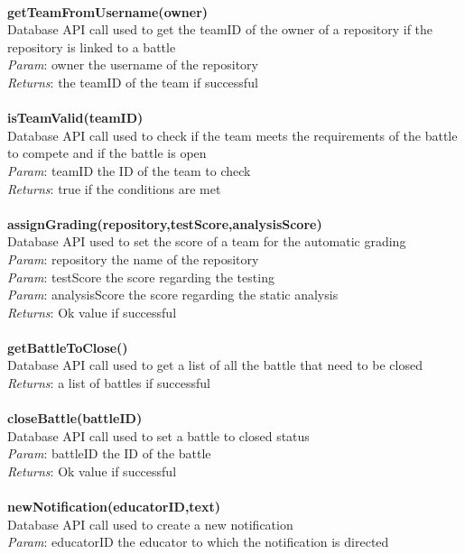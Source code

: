 \documentclass{article}
\begin{document}
\\
\textbf{getTeamFromUsername(owner)}\\
Database API call used to get the teamID of the owner of a repository if the repository is linked to a battle\\
\textit{Param}: owner the username of the repository\\
\textit{Returns}: the teamID of the team if successful\\
\\
\textbf{isTeamValid(teamID)}\\
Database API call used to check if the team meets the requirements of the battle to compete and if the battle is open\\
\textit{Param}: teamID the ID of the team to check\\
\textit{Returns}: true if the conditions are met\\
\\
\textbf{assignGrading(repository,testScore,analysisScore)}\\
Database API used to set the score of a team for the automatic grading\\
\textit{Param}: repository the name of the repository\\
\textit{Param}: testScore the score regarding the testing\\
\textit{Param}: analysisScore the score regarding the static analysis\\
\textit{Returns}: Ok value if successful\\
\\
\textbf{getBattleToClose()}\\
Database API call used to get a list of all the battle that need to be closed\\
\textit{Returns}: a list of battles if successful\\
\\
\textbf{closeBattle(battleID)}\\
Database API call used to set a battle to closed status\\
\textit{Param}: battleID the ID of the battle\\
\textit{Returns}: Ok value if successful\\
\\
\textbf{newNotification(educatorID,text)}\\
Database API call used to create a new notification\\
\textit{Param}: educatorID the educator to which the notification is directed\\
\end{document}
